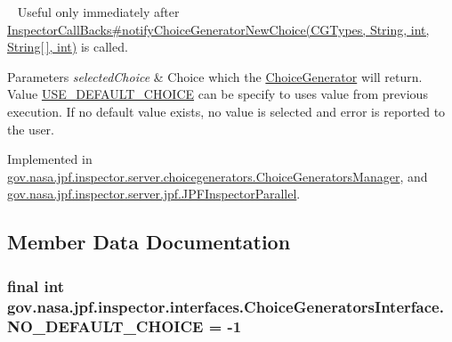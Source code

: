 ~\newline
Useful only immediately after \hyperlink{}{Inspector\+Call\+Backs\#notify\+Choice\+Generator\+New\+Choice(\+C\+G\+Types, String, int, String\mbox{[}$\,$\mbox{]}, int)} is called.


\begin{DoxyParams}{Parameters}
{\em selected\+Choice} & Choice which the \hyperlink{}{Choice\+Generator} will return. Value \hyperlink{interfacegov_1_1nasa_1_1jpf_1_1inspector_1_1interfaces_1_1_choice_generators_interface_ac57a2bb0eb101be2c2b27bd19cb81ea7}{U\+S\+E\+\_\+\+D\+E\+F\+A\+U\+L\+T\+\_\+\+C\+H\+O\+I\+CE} can be specify to uses value from previous execution. If no default value exists, no value is selected and error is reported to the user. \\
\hline
\end{DoxyParams}


Implemented in \hyperlink{classgov_1_1nasa_1_1jpf_1_1inspector_1_1server_1_1choicegenerators_1_1_choice_generators_manager_aec648a136b7b6dbccc233a72b7549090}{gov.\+nasa.\+jpf.\+inspector.\+server.\+choicegenerators.\+Choice\+Generators\+Manager}, and \hyperlink{classgov_1_1nasa_1_1jpf_1_1inspector_1_1server_1_1jpf_1_1_j_p_f_inspector_parallel_a5898acc4397d757c67657541c29f8322}{gov.\+nasa.\+jpf.\+inspector.\+server.\+jpf.\+J\+P\+F\+Inspector\+Parallel}.



\subsection{Member Data Documentation}
\subsubsection[{\texorpdfstring{N\+O\+\_\+\+D\+E\+F\+A\+U\+L\+T\+\_\+\+C\+H\+O\+I\+CE}{NO_DEFAULT_CHOICE}}]{\setlength{\rightskip}{0pt plus 5cm}final int gov.\+nasa.\+jpf.\+inspector.\+interfaces.\+Choice\+Generators\+Interface.\+N\+O\+\_\+\+D\+E\+F\+A\+U\+L\+T\+\_\+\+C\+H\+O\+I\+CE = -\/1\hspace{0.3cm}{\ttfamily [static]}}\hypertarget{interfacegov_1_1nasa_1_1jpf_1_1inspector_1_1interfaces_1_1_choice_generators_interface_a96ec402a57d2b3547337e677e23075cd}{}\label{interfacegov_1_1nasa_1_1jpf_1_1inspector_1_1interfaces_1_1_choice_generators_interface_a96ec402a57d2b3547337e677e23075cd}


